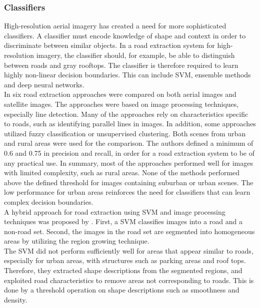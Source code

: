 \subsubsection{Classifiers}
High-resolution aerial imagery has created a need for more sophisticated classifiers. A classifier must encode knowledge of shape and context in order to discriminate between similar objects. In a road extraction system for high-resolution imagery, the classifier should, for example, be able to distinguish between roads and gray rooftops. The classifier is therefore required to learn highly non-linear decision boundaries. This can include \ac{SVM}, ensemble methods and deep neural networks.\\

In \cite{Mayer_road_test} six road extraction approaches were compared on both aerial images and satellite images. The approaches were based on image processing techniques, especially line detection. Many of the approaches rely on characteristics specific to roads, such as identifying parallel lines in images. In addition, some approaches utilized fuzzy classification or unsupervised clustering. Both scenes from urban and rural areas were used for the comparison. The authors defined a minimum of 0.6 and 0.75 in precision and recall, in order for a road extraction system to be of any practical use. In summary, most of the approaches performed well for images with limited complexity, such as rural areas. None of the methods performed above the defined threshold for images containing suburban or urban scenes. The low performance for urban areas reinforces the need for classifiers that can learn complex decision boundaries.\\

A hybrid approach for road extraction using \ac{SVM} and image processing techniques was proposed by \cite{Song_road_extraction_svm}. First, a \ac{SVM} classifies images into a road and a non-road set. Second, the images in the road set are segmented into homogeneous areas by utilizing the region growing technique. \\

The \ac{SVM} did not perform sufficiently well for areas that appear similar to roads, especially for urban areas, with structures such as parking areas and roof tops. Therefore, they extracted shape descriptions from the segmented regions, and exploited road characteristics to remove areas not corresponding to roads. This is done by a threshold operation on shape descriptions such as smoothness and density.\\

